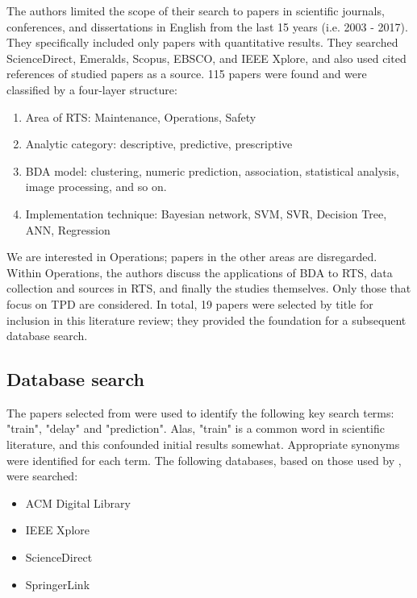 \documentclass{article}
\begin{document}
The authors limited the scope of their search to papers in scientific journals, conferences, and dissertations in English from the last 15 years (i.e. 2003 - 2017). They specifically included only papers with quantitative results. They searched ScienceDirect, Emeralds, Scopus, EBSCO, and IEEE Xplore, and also used cited references of studied papers as a source. 115 papers were found and were classified by a four-layer structure:

\begin{enumerate}
	\item Area of RTS: Maintenance, Operations, Safety
	\item Analytic category: descriptive, predictive, prescriptive
	\item BDA model: clustering, numeric prediction, association, statistical analysis, image processing, and so on.
	\item Implementation technique: Bayesian network, SVM, SVR, Decision Tree, ANN, Regression
\end{enumerate}

We are interested in Operations; papers in the other areas are disregarded. Within Operations, the authors discuss the applications of BDA to RTS, data collection and sources in RTS, and finally the studies themselves.
Only those that focus on TPD are considered. In total, 19 papers were selected by title for inclusion in this literature review; they provided the foundation for a subsequent database search.

\subsection{Database search}

The papers selected from \cite{ghofrani_et_al_2018} were used to identify the following key search terms: "train", "delay" and "prediction". Alas, "train" is a common word in scientific literature, and this confounded initial results somewhat. Appropriate synonyms were identified for each term. The following databases, based on those used by \cite{heckman_williams_2011}, were searched:

\begin{multicols}{2}

\begin{itemize}
	\item ACM Digital Library
	\item IEEE Xplore
	\item ScienceDirect
	\item SpringerLink
\end{itemize}

\end{multicols}
\end{document}
